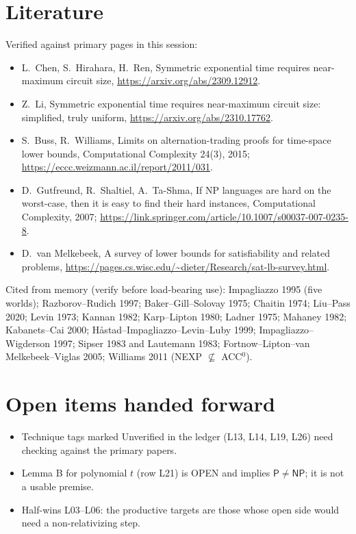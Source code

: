 \documentclass[11pt]{article}
\theoremstyle{remark}
\newcommand{\cP}{\mathsf{P}}
\newcommand{\NP}{\mathsf{NP}}
\begin{document}
\section{Literature}

Verified against primary pages in this session:
\begin{itemize}
\item L.~Chen, S.~Hirahara, H.~Ren, Symmetric exponential time requires near-maximum circuit size,
      \url{https://arxiv.org/abs/2309.12912}.
\item Z.~Li, Symmetric exponential time requires near-maximum circuit size: simplified, truly uniform,
      \url{https://arxiv.org/abs/2310.17762}.
\item S.~Buss, R.~Williams, Limits on alternation-trading proofs for time-space lower bounds,
      Computational Complexity 24(3), 2015; \url{https://eccc.weizmann.ac.il/report/2011/031}.
\item D.~Gutfreund, R.~Shaltiel, A.~Ta-Shma, If NP languages are hard on the worst-case, then it is easy
      to find their hard instances, Computational Complexity, 2007;
      \url{https://link.springer.com/article/10.1007/s00037-007-0235-8}.
\item D.~van Melkebeek, A survey of lower bounds for satisfiability and related problems,
      \url{https://pages.cs.wisc.edu/~dieter/Research/sat-lb-survey.html}.
\end{itemize}
Cited from memory (verify before load-bearing use): Impagliazzo 1995 (five worlds); Razborov--Rudich 1997;
Baker--Gill--Solovay 1975; Chaitin 1974; Liu--Pass 2020; Levin 1973; Kannan 1982; Karp--Lipton 1980;
Ladner 1975; Mahaney 1982; Kabanets--Cai 2000; H{\aa}stad--Impagliazzo--Levin--Luby 1999;
Impagliazzo--Wigderson 1997; Sipser 1983 and Lautemann 1983; Fortnow--Lipton--van Melkebeek--Viglas 2005;
Williams 2011 (NEXP $\not\subseteq$ ACC$^0$).

\section{Open items handed forward}

\begin{itemize}
\item Technique tags marked Unverified in the ledger (L13, L14, L19, L26) need checking against the
      primary papers.
\item Lemma B for polynomial $t$ (row L21) is OPEN and implies $\cP\neq\NP$; it is not a usable premise.
\item Half-wins L03--L06: the productive targets are those whose open side would need a
      non-relativizing step.
\end{itemize}
\end{document}
